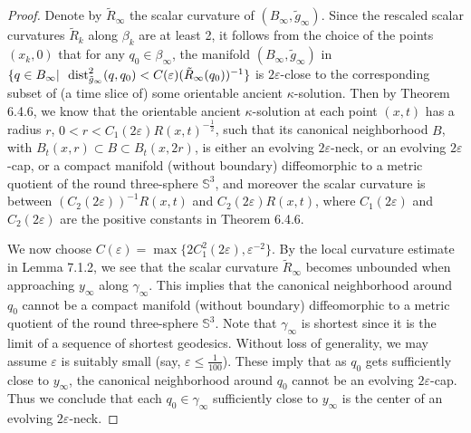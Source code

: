 \begin{proof}
Denote by $\tilde{R}_{\infty}$ the scalar curvature of
$(B_{\infty},\tilde{g}_{\infty})$. Since the rescaled scalar
curvatures $\tilde{R}_k$ along $\beta_k$ are at least 2, it
follows from the choice of the points $(x_k,0)$ that for any
$q_0\in \beta_{\infty}$, the manifold
$(B_{\infty},\tilde{g}_{\infty})$ in $\{q\in B_{\infty}| \ \ {\rm
dist}^2_{\tilde{g}_{\infty}}(q,q_0)<
C(\varepsilon)(\tilde{R}_{\infty}(q_0))^{-1}\}$ is
$2\varepsilon$-close to the corresponding subset of (a time slice
of) some orientable ancient $\kappa$-solution. Then by Theorem
6.4.6, we know that the orientable ancient $\kappa$-solution at
each point $(x,t)$ has a radius $r$, $0 < r <
C_1(2\varepsilon)R(x,t)^{-\frac{1}{2}}$, such that its canonical
neighborhood $B$, with $B_t(x,r) \subset  B \subset B_t(x,2r)$, is
either an evolving $2\varepsilon$-neck, or an evolving
$2\varepsilon$-cap, or a compact manifold (without boundary)
diffeomorphic to a metric quotient of the round three-sphere
$\mathbb{S}^3$, and moreover the scalar curvature is between
$(C_2(2\varepsilon))^{-1}R(x,t)$ and $C_2(2\varepsilon)R(x,t)$,
where $C_1(2\varepsilon)$ and $C_2(2\varepsilon)$ are the positive
constants in Theorem 6.4.6.

We now choose $C(\varepsilon) = \max \{
2C_1^2(2\varepsilon),\varepsilon^{-2}\}$. By the local curvature
estimate in Lemma 7.1.2, we see that the scalar curvature
$\tilde{R}_{\infty}$ becomes unbounded when approaching
$y_{\infty}$ along $\gamma_{\infty}$. This implies that the
canonical neighborhood around $q_0$ cannot be a compact manifold
(without boundary) diffeomorphic to a metric quotient of the round
three-sphere $\mathbb{S}^3$. Note that $\gamma_{\infty}$ is
shortest since it is the limit of a sequence of shortest
geodesics. Without loss of generality, we may assume $\varepsilon$
is suitably small (say, $\varepsilon \leq \frac{1}{100}$). These
imply that as $q_0$ gets sufficiently close to $y_{\infty}$, the
canonical neighborhood around $q_0$ cannot be an evolving
$2\varepsilon$-cap. Thus we conclude that each $q_0 \in
\gamma_{\infty}$ sufficiently close to $y_{\infty}$ is the center
of an evolving $2\varepsilon$-neck.


\end{proof}

